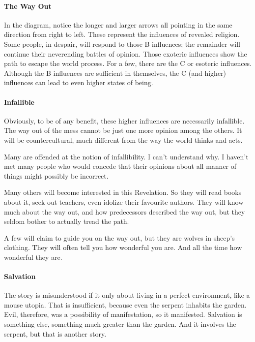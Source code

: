 \paragraph{The Way Out}
In the diagram, notice the longer and larger arrows all pointing in the same direction from right to left. These represent the influences of revealed religion. Some people, in despair, will respond to those B influences; the remainder will continue their neverending battles of opinion. Those exoteric influences show the path to escape the world process. For a few, there are the C or esoteric influences. Although the B influences are sufficient in themselves, the C (and higher) influences can lead to even higher states of being.

\paragraph{Infallible}
Obviously, to be of any benefit, these higher influences are necessarily infallible. The way out of the mess cannot be just one more opinion among the others. It will be countercultural, much different from the way the world thinks and acts.

Many are offended at the notion of infallibility. I can't understand why. I haven't met many people who would concede that their opinions about all manner of things might possibly be incorrect.

Many others will become interested in this Revelation. So they will read books about it, seek out teachers, even idolize their favourite authors. They will know much about the way out, and how predecessors described the way out, but they seldom bother to actually tread the path.

A few will claim to guide you on the way out, but they are wolves in sheep's clothing. They will often tell you how wonderful you are. And all the time how wonderful they are.

\paragraph{Salvation}
The story is misunderstood if it only about living in a perfect environment, like a mouse utopia. That is insufficient, because even the serpent inhabits the garden. Evil, therefore, was a possibility of manifestation, so it manifested. Salvation is something else, something much greater than the garden. And it involves the serpent, but that is another story.



